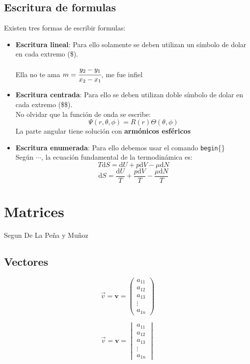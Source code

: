 \documentclass[12pt,a4paper]{article}
\begin{document}
\subsection*{Escritura de formulas}\label{formulas}
Existen tres formas de escribir formulas:\begin{itemize}
\item \textbf{Escritura lineal}: Para ello solamente se deben utilizan un símbolo de dolar en cada extremo (\$).\begin{center}
Ella no te ama $m=\cfrac{y_2-y_1}{x_2-x_1}$, me fue infiel
\end{center}


\item \textbf{Escritura centrada}: Para ello se deben utilizan doble símbolo de dolar en cada extremo (\$\$).\\[0.2cm]
No olvidar que la función de onda se escribe: $$\Psi(r,\theta,\phi)=R(r)\Theta (\theta,\phi)$$ La parte angular tiene solución con \textbf{armónicos esféricos}

\item \textbf{Escritura enumerada}: Para ello debemos usar el comando \texttt{begin}\{\}\\[0.2cm]
Según $\cdots$, la ecuación fundamental de la termodinámica es:\begin{equation}
T\text{d}S=\text{d}U+p\text{d}V-\mu\text{d}N
\end{equation}
$$\text{d}S=\frac{\text{d}U}{T}+\frac{p\text{d}V}{T}-\frac{\mu\text{d}N}{T}$$
\end{itemize}

\section{Matrices}\label{matriz}
Segun De La Peña \cite{DLP} y Muñoz \cite{MJM}
\subsection*{Vectores}
$$\vec{v}=\textbf{v}=\begin{pmatrix}
a_{11} \\ a_{12} \\ a_{13} \\ \vdots \\ a_{1n}
\end{pmatrix}$$

$$\vec{v}=\textbf{v}=\begin{vmatrix}
a_{11} \\ a_{12} \\ a_{13} \\ \vdots \\ a_{1n}
\end{vmatrix}$$
\end{document}

